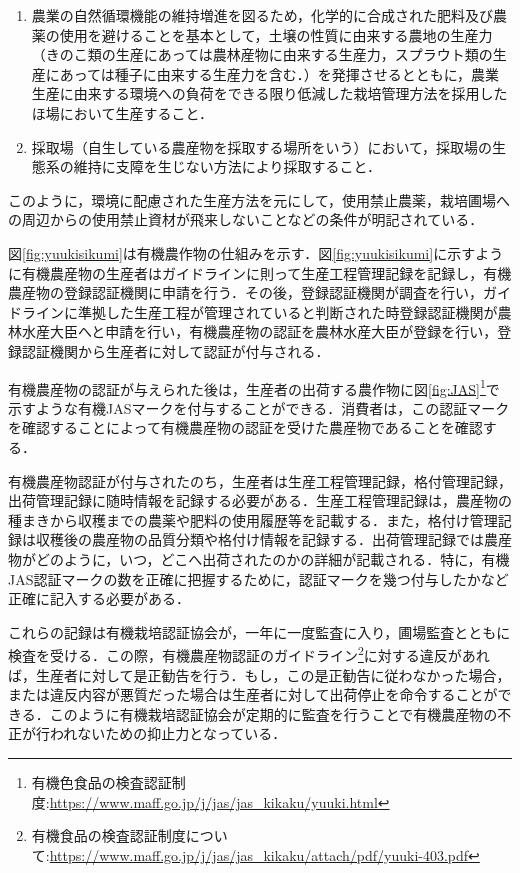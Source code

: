 \documentclass[11pt,dvipdfmx]{jreport}
\begin{document}
\begin{enumerate}
    \item 農業の自然循環機能の維持増進を図るため，化学的に合成された肥料及び農薬の使用を避けることを基本として，土壌の性質に由来する農地の生産力（きのこ類の生産にあっては農林産物に由来する生産力，スプラウト類の生産にあっては種子に由来する生産力を含む．）を発揮させるとともに，農業生産に由来する環境への負荷をできる限り低減した栽培管理方法を採用したほ場において生産すること．
    \item 採取場（自生している農産物を採取する場所をいう）において，採取場の生態系の維持に支障を生じない方法により採取すること．
\end{enumerate}

このように，環境に配慮された生産方法を元にして，使用禁止農薬，栽培圃場への周辺からの使用禁止資材が飛来しないことなどの条件が明記されている．

図\ref{fig:yuukisikumi}は有機農作物の仕組みを示す．図\ref{fig:yuukisikumi}に示すように有機農産物の生産者はガイドラインに則って生産工程管理記録を記録し，有機農産物の登録認証機関に申請を行う．その後，登録認証機関が調査を行い，ガイドラインに準拠した生産工程が管理されていると判断された時登録認証機関が農林水産大臣へと申請を行い，有機農産物の認証を農林水産大臣が登録を行い，登録認証機関から生産者に対して認証が付与される．

有機農産物の認証が与えられた後は，生産者の出荷する農作物に図\ref{fig:JAS}\footnote{有機色食品の検査認証制度:\url{https://www.maff.go.jp/j/jas/jas_kikaku/yuuki.html}}で示すような有機JASマークを付与することができる．消費者は，この認証マークを確認することによって有機農産物の認証を受けた農産物であることを確認する．

有機農産物認証が付与されたのち，生産者は生産工程管理記録，格付管理記録，出荷管理記録に随時情報を記録する必要がある．生産工程管理記録は，農産物の種まきから収穫までの農薬や肥料の使用履歴等を記載する．また，格付け管理記録は収穫後の農産物の品質分類や格付け情報を記録する．出荷管理記録では農産物がどのように，いつ，どこへ出荷されたのかの詳細が記載される．特に，有機JAS認証マークの数を正確に把握するために，認証マークを幾つ付与したかなど正確に記入する必要がある．

これらの記録は有機栽培認証協会が，一年に一度監査に入り，圃場監査とともに検査を受ける．この際，有機農産物認証のガイドライン\footnote{有機食品の検査認証制度について:\url{https://www.maff.go.jp/j/jas/jas_kikaku/attach/pdf/yuuki-403.pdf}}に対する違反があれば，生産者に対して是正勧告を行う．もし，この是正勧告に従わなかった場合，または違反内容が悪質だった場合は生産者に対して出荷停止を命令することができる．このように有機栽培認証協会が定期的に監査を行うことで有機農産物の不正が行われないための抑止力となっている．
\end{document}
